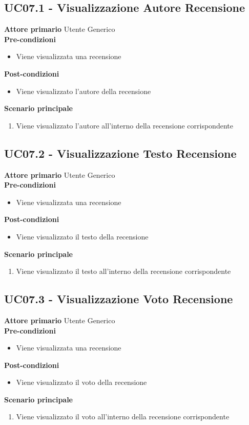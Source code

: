 \subsection{UC07.1 - Visualizzazione Autore Recensione}
\label{UC07.1}
\textbf{Attore primario} Utente Generico \\
\textbf{Pre-condizioni}
\begin{itemize}
    \item Viene visualizzata una recensione
\end{itemize}
\textbf{Post-condizioni}
\begin{itemize}
    \item Viene visualizzato l'autore della recensione
\end{itemize}
\textbf{Scenario principale}
\begin{enumerate}
    \item Viene visualizzato l'autore all'interno della recensione corrispondente
\end{enumerate}

\subsection{UC07.2 - Visualizzazione Testo Recensione}
\label{UC07.2}
\textbf{Attore primario} Utente Generico \\
\textbf{Pre-condizioni}
\begin{itemize}
    \item Viene visualizzata una recensione
\end{itemize}
\textbf{Post-condizioni}
\begin{itemize}
    \item Viene visualizzato il testo della recensione
\end{itemize}
\textbf{Scenario principale}
\begin{enumerate}
    \item Viene visualizzato il testo all'interno della recensione corrispondente
\end{enumerate}

\subsection{UC07.3 - Visualizzazione Voto Recensione}
\label{UC07.3}
\textbf{Attore primario} Utente Generico \\
\textbf{Pre-condizioni}
\begin{itemize}
    \item Viene visualizzata una recensione
\end{itemize}
\textbf{Post-condizioni}
\begin{itemize}
    \item Viene visualizzato il voto della recensione
\end{itemize}
\textbf{Scenario principale}
\begin{enumerate}
    \item Viene visualizzato il voto all'interno della recensione corrispondente
\end{enumerate}


